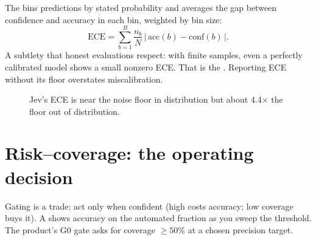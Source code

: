 The  bins predictions by stated probability and
averages the gap between confidence and accuracy in each bin, weighted by bin size:
\[
\mathrm{ECE} = \sum_{b=1}^{B} \frac{n_b}{N}\,\bigl|\,\mathrm{acc}(b) - \mathrm{conf}(b)\,\bigr|.
\]
A subtlety that honest evaluations respect: with finite samples, even a perfectly calibrated
model shows a small nonzero ECE. That is the . Reporting ECE without its
floor overstates miscalibration.

\begin{figure}[h]\centering
{}
\caption{Jev's ECE is near the noise floor in distribution but about 4.4\(\times\) the floor
out of distribution.~\citep{jev_ood_calibration}}
\label{fig:ece}
\end{figure}

\section{Risk--coverage: the operating decision}

Gating is a trade: act only when confident (high  costs accuracy; low
coverage buys it). A  shows accuracy on the automated fraction as
you sweep the threshold. The product's G0 gate asks for coverage $\ge 50\%$ at a chosen
precision target.

